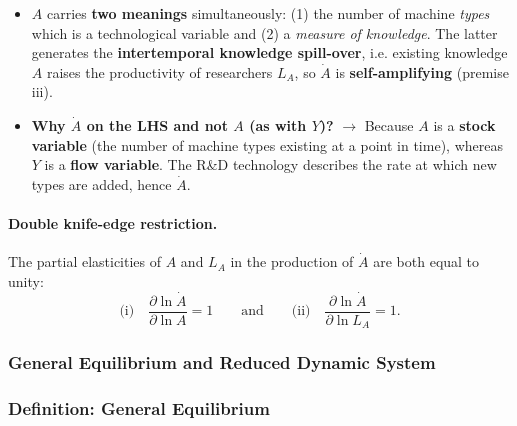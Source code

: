 \begin{itemize}
    \item $A$ carries \textbf{two meanings} simultaneously: (1) the number of machine \textit{types} which is a technological variable and (2) a \textit{measure of knowledge}. The latter generates the \textbf{intertemporal knowledge spill-over}, i.e. existing knowledge $A$ raises the productivity of researchers $L_A$, so $\dot{A}$ is \textbf{self-amplifying} (premise iii).
    \item \textbf{Why $\dot{A}$ on the LHS and not $A$ (as with $Y$)?} $\rightarrow$ Because $A$ is a \textbf{stock variable} (the number of machine types existing at a point in time), whereas $Y$ is a \textbf{flow variable}. The R\&D technology describes the rate at which new types are added, hence $\dot{A}$.
\end{itemize}

\paragraph{Double knife-edge restriction.} The partial elasticities of $A$ and $L_A$ in the production of $\dot{A}$ are both equal to unity:
\[
    \text{(i)} \quad \frac{\partial \ln \dot{A}}{\partial \ln A} = 1 \qquad \text{and} \qquad \text{(ii)} \quad \frac{\partial \ln \dot{A}}{\partial \ln L_A} = 1.
\]


\subsubsection{General Equilibrium and Reduced Dynamic System}

\subsubsection*{Definition: General Equilibrium}

